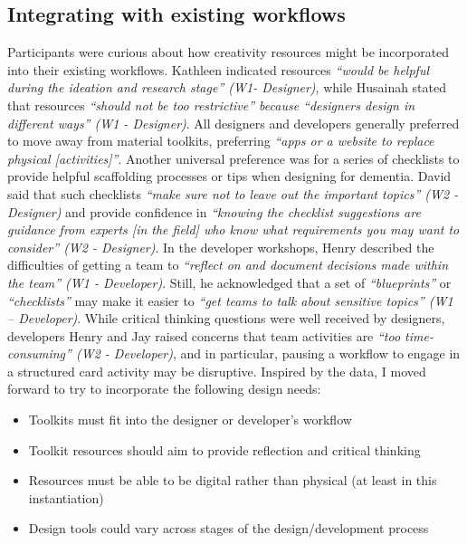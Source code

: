 \subsection{Integrating with existing workflows}
Participants were curious about how creativity resources might be incorporated into their existing workflows. Kathleen indicated resources \textit{``would be helpful during the ideation and research stage'' (W1- Designer)}, while Husainah stated that resources \textit{``should not be too restrictive'' because ``designers design in different ways'' (W1 - Designer)}. All designers and developers generally preferred to move away from material toolkits, preferring \textit{``apps or a website to replace physical [activities]''}. 
Another universal preference was for a series of checklists to provide helpful scaffolding processes or tips when designing for dementia. David said that such checklists \textit{``make sure not to leave out the important topics'' (W2 - Designer)} and provide confidence in \textit{``knowing the checklist suggestions are guidance from experts [in the field] who know what requirements you may want to consider'' (W2 - Designer)}. In the developer workshops, Henry described the difficulties of getting a team to \textit{``reflect on and document decisions made within the team'' (W1 - Developer)}. Still, he acknowledged that a set of \textit{``blueprints''} or \textit{``checklists''} may make it easier to \textit{``get teams to talk about sensitive topics'' (W1 – Developer)}. 
While critical thinking questions were well received by designers, developers Henry and Jay raised concerns that team activities are \textit{``too time-consuming'' (W2 - Developer)}, and in particular, pausing a workflow to engage in a structured card activity may be disruptive. Inspired by the data, I moved forward to try to incorporate the following design needs:
\begin{itemize}
\item Toolkits must fit into the designer or developer’s workflow	
\item Toolkit resources should aim to provide reflection and critical thinking
\item Resources must be able to be digital rather than physical (at least in this instantiation)
\item Design tools could vary across stages of the design/development process 
\end{itemize}

